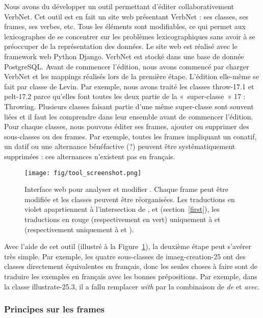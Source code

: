 Nous avons du développer un outil permettant d'éditer collaborativement
VerbNet. Cet outil est en fait un site web présentant VerbNet : ses classes,
ses frames, ses verbes, etc. Tous les éléments sont modifiables, ce qui permet
aux lexicographes de se concentrer sur les problèmes lexicographiques sans
avoir à se préoccuper de la représentation des données. Le site web est réalisé
avec le framework web Python Django. VerbNet est stocké dans une base de donnée
PostgreSQL. Avant de commencer l'édition, nous avons commencé par charger
VerbNet et les mappings réalisés lors de la première étape. L'édition elle-même
se fait par classe de Levin. Par exemple, nous avons traité les classes
{\color{blue}throw-17.1} et {\color{blue}pelt-17.2} parce qu'elles font toutes
les deux partie de la «~super-classe~» 17 : Throwing. Plusieurs classes faisant
partie d'une même super-classe sont souvent liées et il faut les comprendre
dans leur ensemble avant de commencer l'édition. Pour chaque classes, nous
pouvons éditer ses frames, ajouter ou supprimer des sous-classes ou des frames.
Par exemple, toutes les frames impliquant un conatif, un datif ou une
alternance bénéfactive (?) peuvent être systématiquement supprimées : ces
alternances n'existent pas en français.

\begin{figure}
    \centering
    \texttt{[image: fig/tool\_screenshot.png]}
    \caption{\label{tool}Interface web pour analyser et modifier \verbenet{}.
    Chaque frame peut être modifiée et les classes peuvent être réorganisées. Les
    traductions en violet apaprtiennent à l'intersection de \Clvf{}, \Clg{} et
    \Ltrad{} (section~\ref{first}), les traductions en rouge (respectivement en
    vert) uniquement à \Clvf{} et \Ltrad (respectivement uniquement à \Clg{} et
    \Ltrad{}).}
\end{figure}

Avec l'aide de cet outil (illustré à la Figure~\ref{tool}), la deuxième étape
peut s'avérer très simple. Par exemple, les quatre sous-classes de
{\color{blue}imaeg-creation-25} ont des classes directement équivalentes en
français, donc les seules choses à faire sont de traduire les exemples en
français avec les bonnes prépositions. Par exemple, dans la classe
{\color{blue}illustrate-25.3}, il a fallu remplacer \emph{with} par la
combinaison de \emph{de} et \emph{avec}.

\subsubsection{Principes sur les frames}\label{princp}

